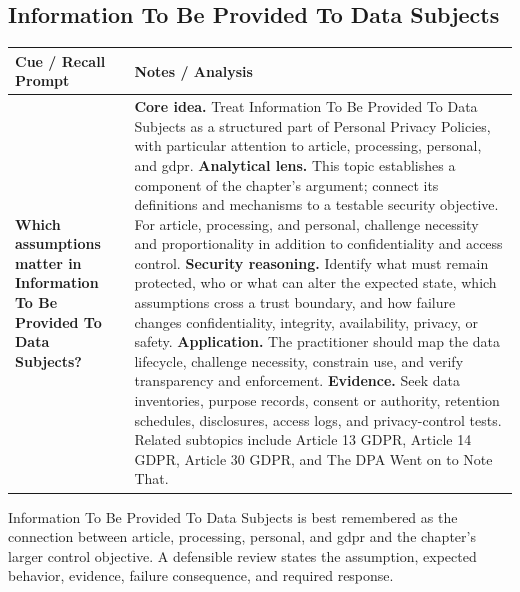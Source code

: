 \documentclass[11pt]{article}
\newcommand{\CornellHeader}{%
\rowcolor{Navy}\color{white}\bfseries Cue / Recall Prompt & \color{white}\bfseries Notes / Analysis\\\hline}
\newcommand{\CornellRow}[2]{%
\cellcolor{CueGray}\RaggedRight\textbf{#1} & \RaggedRight #2\\\hline}
\begin{document}
\subsection*{Information To Be Provided To Data Subjects}
\begin{longtable}{>{\RaggedRight\arraybackslash}p{}|>{\RaggedRight\arraybackslash}p{}}
\CornellHeader
\CornellRow{Which assumptions matter in Information To Be Provided To Data Subjects?}{\textbf{Core idea.} Treat Information To Be Provided To Data Subjects as a structured part of Personal Privacy Policies, with particular attention to article, processing, personal, and gdpr. \textbf{Analytical lens.} This topic establishes a component of the chapter's argument; connect its definitions and mechanisms to a testable security objective. For article, processing, and personal, challenge necessity and proportionality in addition to confidentiality and access control. \textbf{Security reasoning.} Identify what must remain protected, who or what can alter the expected state, which assumptions cross a trust boundary, and how failure changes confidentiality, integrity, availability, privacy, or safety. \textbf{Application.} The practitioner should map the data lifecycle, challenge necessity, constrain use, and verify transparency and enforcement. \textbf{Evidence.} Seek data inventories, purpose records, consent or authority, retention schedules, disclosures, access logs, and privacy-control tests. Related subtopics include Article 13 GDPR, Article 14 GDPR, Article 30 GDPR, and The DPA Went on to Note That.}
\end{longtable}
\begin{topicsummary}
Information To Be Provided To Data Subjects is best remembered as the connection between article, processing, personal, and gdpr and the chapter's larger control objective. A defensible review states the assumption, expected behavior, evidence, failure consequence, and required response.
\end{topicsummary}
\end{document}
